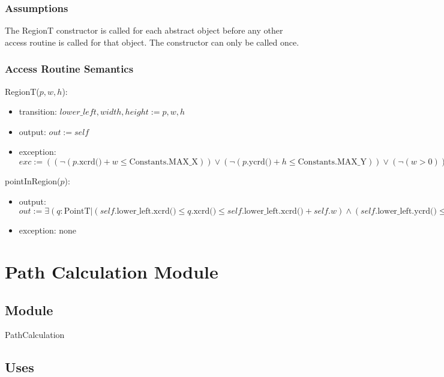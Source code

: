 \documentclass[12pt]{article}
\begin{document}
\subsubsection* {Assumptions}
The RegionT constructor is called for each abstract object before any other access routine is called for that
object.  The constructor can only be called once.

\subsubsection* {Access Routine Semantics}

\noindent RegionT($p, w, h$):
\begin{itemize}
\item transition: $\mathit{lower\_left}, \mathit{width}, \mathit{height} := p, w, h$
\item output: $out := \mathit{self}$
\item exception: $exc := ((\neg(p.\mbox{xcrd()} + w \leq \mbox{Constants.MAX\_X})) \vee (\neg(p.\mbox{ycrd()} + h \leq \mbox{Constants.MAX\_Y})) \vee (\neg (w > 0)) \vee (\neg (h > 0)) \Rightarrow
\mbox{InvalidRegionException}) $
\end{itemize}

\noindent pointInRegion($p$):
\begin{itemize}
\item output: $\mathit{out} := \exists ( q: \mbox{PointT} | (self.\mbox{lower\_left.xcrd()} \leq q.\mbox{xcrd()} \leq self.\mbox{lower\_left.xcrd()} + self.w) \wedge (self.\mbox{lower\_left.ycrd()} \leq q.\mbox{ycrd()} \leq self.\mbox{lower\_left.ycrd()} + self.h) : q.\mbox{dist}(p) < \mbox{Constants.TOLERANCE})$
\item exception: none
\end{itemize}

\newpage

\section* {Path Calculation Module}

\subsection* {Module}

PathCalculation

\subsection* {Uses}
\end{document}
